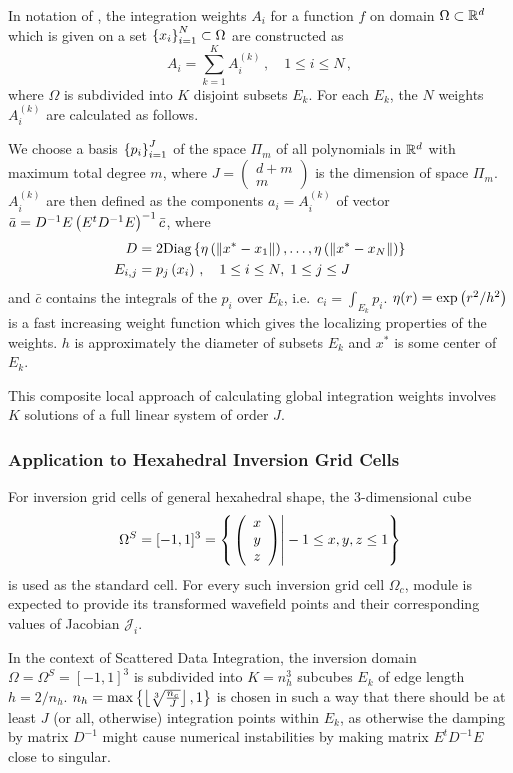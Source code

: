 In notation of \cite{Levin99}{}, the integration weights $A_i$ for a function $f$ on domain $\Omega\subset\mathbb{R}^d$ 
which is given on a set $\left\{ x_i \right\}_{i=1}^N\subset\Omega$ are constructed as
\[
A_i = \sum_{k=1}^K A_i^{(k)} \,,\quad 1 \le i \le N \, , 
\]
where $\Omega$ is subdivided into $K$ disjoint subsets $E_k$. For each $E_k$, the $N$ weights $A_i^{(k)}$ are 
calculated as follows.

We choose a basis $\left\{ p_i \right\}_{i=1}^J$ of the space $\Pi_m$ of all polynomials in $\mathbb{R}^d$ with maximum total 
degree $m$, where $J = \left(\begin{array}{c} d+m \\ m \end{array}\right)$ is the dimension of space $\Pi_m$. 
$A_i^{(k)}$ are then defined as the components $a_i = A_i^{(k)}$ of vector $\bar{a} = 
D^{-1}E\left( E^tD^{-1}E \right)^{-1}\bar{c}$, where
\begin{align*}
  D &= 2\text{Diag}\left\{ \eta\left( \|x^\ast-x_1\| \right),\dots,\eta\left( \|x^\ast-x_N\| \right) \right\}\\
  E_{i,j} &= p_j\left( x_i \right)\,,\quad 1\le i\le N,\; 1\le j\le J
\end{align*}
and $\bar{c}$ contains the integrals of the $p_i$ over $E_k$, i.e.~$c_i = \int_{E_k} p_i$. $\eta(r) = 
\exp\left( r^2/h^2 \right)$ is a fast increasing weight function which gives the localizing properties of the weights. 
$h$ is approximately the diameter of subsets $E_k$ and $x^\ast$ is some center of $E_k$.

This composite local approach of calculating global integration weights involves $K$ solutions of a full 
linear system of order $J$. 
%
\subsubsection{Application to Hexahedral Inversion Grid Cells}
%
For inversion grid cells of general hexahedral shape, the 3-dimensional cube 
\[\Omega^S = [-1,1]^3 = \left\{ \left. \left( \begin{array}{c} x \\ y \\ z \end{array} \right) \right| -1 \le x,y,z \le 1 \right\}\]
is used as the standard cell. For every such inversion grid cell $\Omega_c$, module  
is expected to provide its transformed wavefield points \wpS and their corresponding values of Jacobian 
$\mathcal{J}_i$.

In the context of Scattered Data Integration, the inversion domain $\Omega=\Omega^S=[-1,1]^3$ is subdivided into
$K = n_h^3$ subcubes $E_k$ of edge length $h=2/n_h$. $n_h=\max\left\{ \left\lfloor\sqrt[3]{\frac{n_c}{J}}\right\rfloor,1 \right\}$ 
is chosen in such a way that there should be at least $J$ (or all, otherwise) integration points within $E_k$, as 
otherwise the damping by matrix $D^{-1}$ might cause numerical instabilities by making matrix $E^tD^{-1}E$ close 
to singular. 

